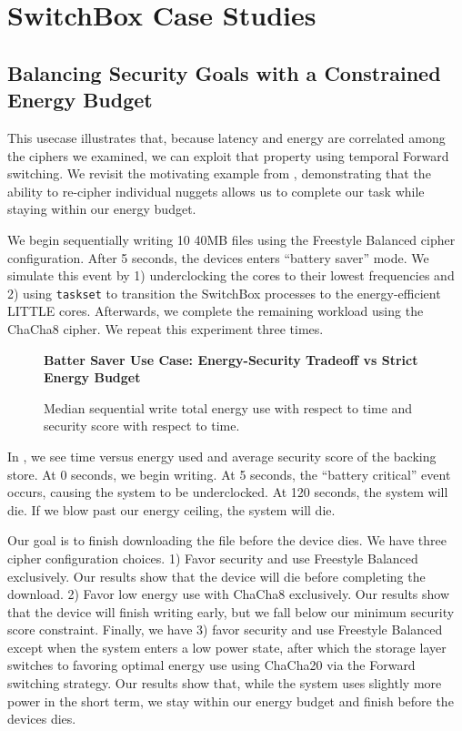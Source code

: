 \section{SwitchBox Case Studies}\label{sec:usecases}

\subsection{Balancing Security Goals with a Constrained Energy Budget}

This usecase illustrates that, because latency and energy are correlated among
the ciphers we examined, we can exploit that property using temporal Forward
switching. We revisit the motivating example from ,
demonstrating that the ability to re-cipher individual nuggets allows us to
complete our task while staying within our energy budget.

We begin sequentially writing 10 40MB files using the Freestyle Balanced cipher
configuration. After 5 seconds, the devices enters ``battery saver'' mode. We
simulate this event by 1) underclocking the cores to their lowest
frequencies and 2) using \texttt{taskset} to transition the SwitchBox processes
to the energy-efficient LITTLE cores. Afterwards, we complete the remaining
workload using the ChaCha8 cipher. We repeat this experiment three times.

\begin{figure}[ht] \textbf{Batter Saver Use Case: Energy-Security Tradeoff vs
   Strict Energy Budget}\par\medskip
   \centering
   {} \caption{Median sequential write total
   energy use with respect to time and security score with respect to time.}
  \label{fig:usecase-battery}
\end{figure}

In , we see time versus energy used and average security
score of the backing store. At 0 seconds, we begin writing. At 5 seconds, the
``battery critical'' event occurs, causing the system to be underclocked. At 120
seconds, the system will die. If we blow past our energy ceiling, the system
will die.

Our goal is to finish downloading the file before the device dies. We have three
cipher configuration choices. 1) Favor security and use Freestyle Balanced
exclusively. Our results show that the device will die before completing the
download. 2) Favor low energy use with ChaCha8 exclusively. Our results show
that the device will finish writing early, but we fall below our minimum
security score constraint. Finally, we have 3) favor security and use Freestyle
Balanced except when the system enters a low power state, after which the
storage layer switches to favoring optimal energy use using ChaCha20 via the
Forward switching strategy. Our results show that, while the system uses
slightly more power in the short term, we stay within our energy budget and
finish before the devices dies.

